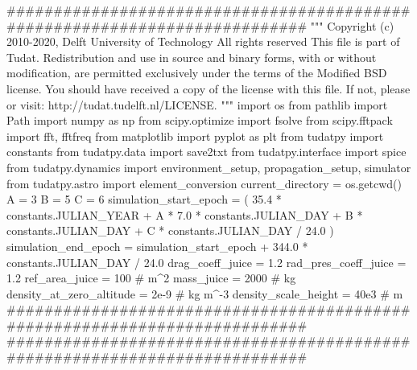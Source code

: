 {}########################################################################### """ Copyright (c) 2010-2020, Delft University of Technology All rights reserved This file is part of Tudat. Redistribution and use in source and binary forms, with or without modification, are permitted exclusively under the terms of the Modified BSD license. You should have received a copy of the license with this file. If not, please or visit: http://tudat.tudelft.nl/LICENSE. """ import os from pathlib import Path import numpy as np from scipy.optimize import fsolve from scipy.fftpack import fft, fftfreq from matplotlib import pyplot as plt from tudatpy import constants from tudatpy.data import save2txt from tudatpy.interface import spice from tudatpy.dynamics import environment_setup, propagation_setup, simulator from tudatpy.astro import element_conversion\markdownRendererInterblockSeparator
{}
\markdownRendererSectionEnd \markdownRendererSectionBegin
{}\markdownRendererInterblockSeparator
{}current_directory = os.getcwd()\markdownRendererInterblockSeparator
{}
\markdownRendererSectionEnd \markdownRendererSectionBegin
{}\markdownRendererInterblockSeparator
{}A = 3 B = 5 C = 6 simulation_start_epoch = ( 35.4 * constants.JULIAN_YEAR + A * 7.0 * constants.JULIAN_DAY + B * constants.JULIAN_DAY + C * constants.JULIAN_DAY / 24.0 ) simulation_end_epoch = simulation_start_epoch + 344.0 * constants.JULIAN_DAY / 24.0\markdownRendererInterblockSeparator
{}
\markdownRendererSectionEnd \markdownRendererSectionBegin
{}\markdownRendererInterblockSeparator
{}
\markdownRendererSectionEnd \markdownRendererSectionBegin
{}\markdownRendererInterblockSeparator
{}drag_coeff_juice = 1.2 rad_pres_coeff_juice = 1.2 ref_area_juice = 100 # m^2 mass_juice = 2000 # kg\markdownRendererInterblockSeparator
{}
\markdownRendererSectionEnd \markdownRendererSectionBegin
{}\markdownRendererInterblockSeparator
{}density_at_zero_altitude = 2e-9 # kg m^-3 density_scale_height = 40e3 # m\markdownRendererInterblockSeparator
{}###########################################################################\markdownRendererInterblockSeparator
{}
\markdownRendererSectionEnd \markdownRendererSectionBegin
{}\markdownRendererInterblockSeparator
{}###########################################################################\markdownRendererInterblockSeparator
